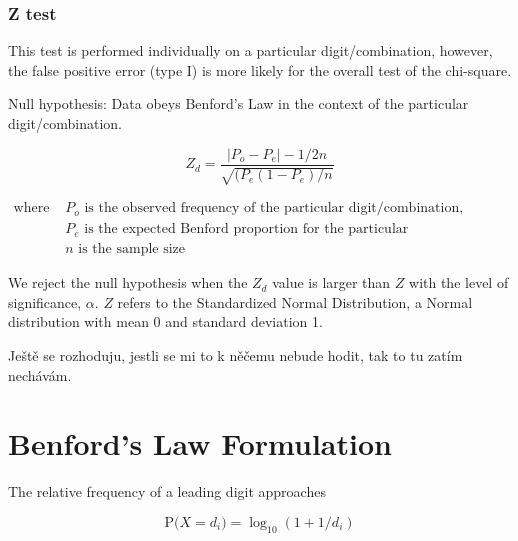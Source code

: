 
\subsubsection*{Z test}

This test is performed individually on a particular digit/combination, however, the false positive error (type I) is more likely for the overall test of the chi-square.

Null hypothesis: Data obeys Benford's Law in the context of the particular digit/combination. %

\begin{equation}
    \label{z_test}
    Z_d = \frac{|P_o - P_e| - 1/2n}{\sqrt{(P_e(1-P_e)/n}}
\end{equation}

\begin{align*}
    \text{where } &P_o \text{ is the observed frequency of the particular digit/combination}, \\
    &P_e \text{ is the expected Benford proportion for the particular digit/combination, and} \\ 
    &n \text{ is the sample size}
\end{align*} 

We reject the null hypothesis when the $Z_d$ value is larger than $Z$ with the level of significance, $\alpha$. $Z$ refers to the Standardized Normal Distribution, a Normal distribution with mean 0 and standard deviation 1. \cite{kossovsky2014benford}

\begin{koment}
    Ještě se rozhoduju, jestli se mi to k něčemu nebude hodit, tak to tu zatím nechávám.  
\end{koment}

\section{Benford's Law Formulation}

The relative frequency of a leading digit approaches 

\begin{equation}
    \label{BZ-general_first}
\text{P(} X = d_i\text{)}= \log_{10}(1+1/d_i)
\end{equation}


